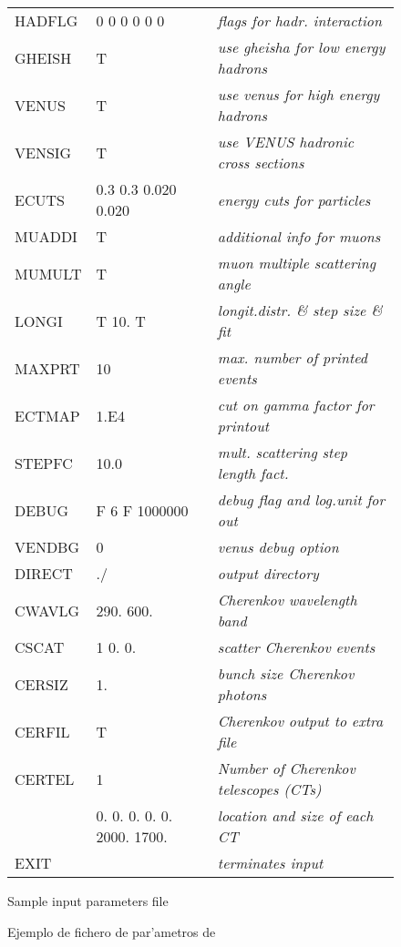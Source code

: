 {\begin{figure}[tb]
\begin{center}
\begin{tabular}{lll}
HADFLG &0  0  0  0  0  0             & {\rmfamily\itshape flags for hadr. interaction} \\
GHEISH &T                            & {\rmfamily\itshape use gheisha for low energy hadrons} \\
VENUS  &T                            & {\rmfamily\itshape use venus for high energy hadrons} \\
VENSIG &T                            & {\rmfamily\itshape use VENUS hadronic cross sections} \\
ECUTS  &0.3  0.3  0.020 0.020        & {\rmfamily\itshape energy cuts for particles} \\
MUADDI &T                            & {\rmfamily\itshape additional info for muons} \\
MUMULT &T                            & {\rmfamily\itshape muon multiple scattering angle} \\
LONGI  &T  10.  T                    & {\rmfamily\itshape longit.distr. \& step size \& fit} \\
MAXPRT &10                           & {\rmfamily\itshape max. number of printed events} \\
ECTMAP &1.E4                         & {\rmfamily\itshape cut on gamma factor for printout} \\
STEPFC &10.0                         & {\rmfamily\itshape mult. scattering step length fact.} \\
DEBUG  &F  6  F  1000000             & {\rmfamily\itshape debug flag and log.unit for out} \\
VENDBG &0                            & {\rmfamily\itshape venus debug option} \\
DIRECT &./                           & {\rmfamily\itshape output directory} \\
CWAVLG &290.  600.                   & {\rmfamily\itshape Cherenkov wavelength band} \\
CSCAT  &1  0.  0.                    & {\rmfamily\itshape scatter Cherenkov events} \\
CERSIZ &1.                           & {\rmfamily\itshape bunch size Cherenkov photons} \\
CERFIL &T                            & {\rmfamily\itshape Cherenkov output to extra file} \\
CERTEL &       1                     & {\rmfamily\itshape Number of Cherenkov telescopes (CTs)} \\
       &0. 0. 0. 0. 0. 2000. 1700.   & {\rmfamily\itshape location and size of each CT} \\
EXIT   &                             & {\rmfamily\itshape terminates input} \\
\hline
\end{tabular}
\end{center}
\ifenglish
\caption{Sample \CORSIKA input parameters file}
\else
\caption{Ejemplo de fichero de par'ametros de \CORSIKA}
\fi
\label{fig:corinput}
\end{figure}
}



